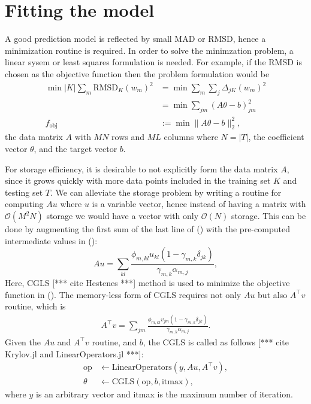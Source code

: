 \documentclass[12pt]{article}
\def\att{                    %
        \marginpar[ \hspace*{\fill} \raisebox{-0.2em}{\rule{2mm}{1.2em}} ]
        {\raisebox{-0.2em}{\rule{2mm}{1.2em}} }
        }
\def\at#1{[*** \att #1 ***]}  %
\begin{document}
\section{Fitting the model}
A good prediction model is reflected by small MAD or RMSD, hence a minimization routine is required. In order to solve the minimzation problem, a linear sysem or least squares formulation is needed. For example, if the RMSD is chosen as the objective function then the problem formulation would be
\begin{equation}
    \label{eq:min}
    \begin{split}
        \min |K| \sum_m \text{RMSD}_K(w_m)^2 &= \min \sum_m \sum_j \Delta_{jK}(w_m)^2 \\
        &= \min \sum_{jm} \left( A\theta - b\right)_{jm}^2 \\
        f_{\text{obj}} &:= \min \|A \theta - b\|_2^2,
    \end{split}
\end{equation}
the data matrix $A$ with $MN$ rows and $ML$ columns where $N = |T|$, the coefficient vector $\theta$, and the target vector $b$.

For storage efficiency, it is desirable to not explicitly form the data matrix $A$, since it grows quickly with more data points included in the training set $K$ and testing set $T$. 
We can alleviate the storage problem by writing a routine for computing $Au$ where $u$ is a variable vector, hence instead of having a matrix with $\mathcal{O}(M^2N)$ storage we would have a vector with only $\mathcal{O}(N)$ storage. 
This can be done by augmenting the first sum of the last line of () with the pre-computed intermediate values in ():
\begin{equation}
	Au = \sum_{kl} \frac{\phi_{m, kl} u_{kl} (1-\gamma_{m, k}\delta_{jk})}{\gamma_{m,k}\alpha_{m,j}},
\end{equation}
Here, CGLS \at{cite Hestenes} method is used to minimize the objective function in (). The memory-less form of CGLS requires not only $Au$ but also $A^\top v$ routine, which is
\begin{equation}
	\begin{split}
		A^\top v = \sum_{jm} \frac{\phi_{m, kl} v_{jm} (1-\gamma_{m, k}\delta_{jk})}{\gamma_{m,k}\alpha_{m,j}}.
	\end{split}
\end{equation}
Given the $Au$ and $A^\top v$ routine, and $b$, the CGLS is called as follows \at{cite Krylov.jl and LinearOperators.jl}:
\begin{equation*}
	\begin{split}
		\text{op} &\leftarrow \text{LinearOperators}(y, Au, A^\top v), \\
		\theta &\leftarrow \text{CGLS}(\text{op}, b, \text{itmax}),
	\end{split}
\end{equation*}
where $y$ is an arbitrary vector and itmax is the maximum number of iteration.
\end{document}
